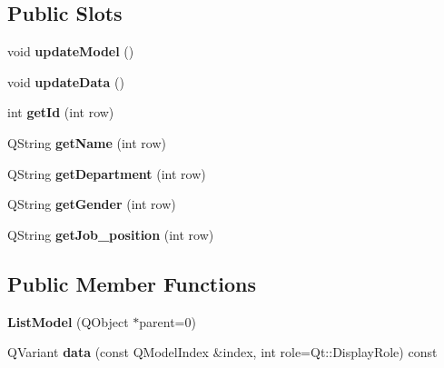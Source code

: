 \subsection*{Public Slots}
\begin{DoxyCompactItemize}
\item 
\mbox{\label{class_list_model_aca658eddcc300788b566f3c698b6a296}} 
void {\bfseries update\+Model} ()
\item 
\mbox{\label{class_list_model_a9671f673440a893fe72b393df53d32f8}} 
void {\bfseries update\+Data} ()
\item 
\mbox{\label{class_list_model_ad52415be6403eae2c4b5b38bed922fb9}} 
int {\bfseries get\+Id} (int row)
\item 
\mbox{\label{class_list_model_a418107418cbddf6f96e245df2f3464af}} 
Q\+String {\bfseries get\+Name} (int row)
\item 
\mbox{\label{class_list_model_a56818d355bcd0978ff89d01327e899d6}} 
Q\+String {\bfseries get\+Department} (int row)
\item 
\mbox{\label{class_list_model_ab1396f72e481816fcb30cdf67d90cda4}} 
Q\+String {\bfseries get\+Gender} (int row)
\item 
\mbox{\label{class_list_model_a5374a643c5726f7ae9157cad07b66703}} 
Q\+String {\bfseries get\+Job\+\_\+position} (int row)
\end{DoxyCompactItemize}
\subsection*{Public Member Functions}
\begin{DoxyCompactItemize}
\item 
\mbox{\label{class_list_model_a26cd1a0d21d6015d4847774acfe9a716}} 
{\bfseries List\+Model} (Q\+Object $\ast$parent=0)
\item 
\mbox{\label{class_list_model_a75ad769eac92db357d5a9fbedd9c2bc4}} 
Q\+Variant {\bfseries data} (const Q\+Model\+Index \&index, int role=Qt\+::\+Display\+Role) const
\end{DoxyCompactItemize}
